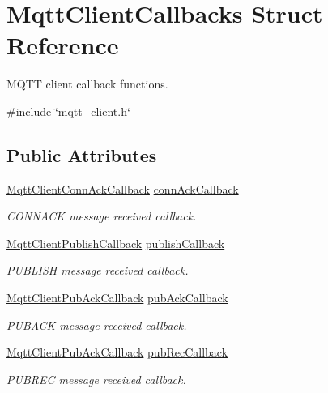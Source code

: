 \hypertarget{structMqttClientCallbacks}{}\section{Mqtt\+Client\+Callbacks Struct Reference}
\label{structMqttClientCallbacks}


M\+Q\+TT client callback functions.  




{\ttfamily \#include \char`\"{}mqtt\+\_\+client.\+h\char`\"{}}

\subsection*{Public Attributes}
\begin{DoxyCompactItemize}
\item 
\hyperlink{mqtt__client_8h_a383a94b4f1e3508537ab73c3aba4d2e0}{Mqtt\+Client\+Conn\+Ack\+Callback} \hyperlink{structMqttClientCallbacks_aed5ae5936c4f84ee5ef14316b0bbcd84}{conn\+Ack\+Callback}
\begin{DoxyCompactList}\small\item\em C\+O\+N\+N\+A\+CK message received callback. \end{DoxyCompactList}\item 
\hyperlink{mqtt__client_8h_a4759a59946ab022e19349ed194794897}{Mqtt\+Client\+Publish\+Callback} \hyperlink{structMqttClientCallbacks_a2cb4f90abda3eedfdc20771ce9e3fe94}{publish\+Callback}
\begin{DoxyCompactList}\small\item\em P\+U\+B\+L\+I\+SH message received callback. \end{DoxyCompactList}\item 
\hyperlink{mqtt__client_8h_a795fdcc921902cd871b766c91770a469}{Mqtt\+Client\+Pub\+Ack\+Callback} \hyperlink{structMqttClientCallbacks_a5dd66ac0e95defbed26465e92c3fa276}{pub\+Ack\+Callback}
\begin{DoxyCompactList}\small\item\em P\+U\+B\+A\+CK message received callback. \end{DoxyCompactList}\item 
\hyperlink{mqtt__client_8h_a795fdcc921902cd871b766c91770a469}{Mqtt\+Client\+Pub\+Ack\+Callback} \hyperlink{structMqttClientCallbacks_a06d03fb2617a953dec60137af47ebc6b}{pub\+Rec\+Callback}
\begin{DoxyCompactList}\small\item\em P\+U\+B\+R\+EC message received callback. \end{DoxyCompactList}\item 

\end{DoxyCompactItemize}
